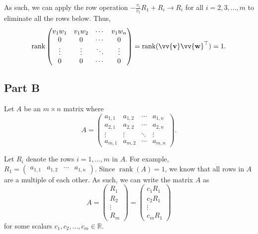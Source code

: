 \documentclass[12pt]{article}
\newcommand{\vect}[1]{\vv{\mathbf{#1}}}
\newcommand{\R}{\mathbb{R}}
\newcommand{\rank}{\operatorname{rank}}
\begin{document}
As such, we can apply the row operation $-\frac{v_i}{v_1}R_1 + R_i \to R_i$ for all $i=2,3,\ldots,m$ to eliminate all the rows below. Thus,
$$
\rank\begin{pmatrix}
    v_1w_1 & v_1w_2 & \cdots & v_1w_n \\
    0 & 0 & \cdots & 0 \\
    \vdots & \vdots & \ddots & \vdots \\
    0 & 0 & \cdots & 0 \\
\end{pmatrix} = \rank(\vect{v}\vect{w}^\top) = 1.
$$

\subsection*{Part B}

Let $A$ be an $m\times n$ matrix where
$$
A = \begin{pmatrix}
    a_{1,1} & a_{1,2} & \cdots & a_{1,n} \\
    a_{2,1} & a_{2,2} & \cdots & a_{2,n} \\
    \vdots & \vdots & \ddots & \vdots \\
    a_{m,1} & a_{m,2} & \cdots & a_{m,n}
\end{pmatrix}.
$$

Let $R_i$ denote the rows $i=1,\ldots,m$ in $A$. For example, $R_1 = \begin{pmatrix}
    a_{1,1} & a_{1,2} & \cdots & a_{1,n}
\end{pmatrix}$. Since $\rank(A)=1$, we know that all rows in $A$ are a multiple of each other. As such, we can write the matrix $A$ as
$$
A = \begin{pmatrix}
    R_1 \\ R_2 \\ \vdots \\ R_m
\end{pmatrix}
=
\begin{pmatrix}
    c_1R_1 \\ c_2R_1 \\ \vdots \\ c_mR_1
\end{pmatrix}
$$
for some scalars $c_1,c_2,\ldots,c_m\in\R$.
\end{document}
